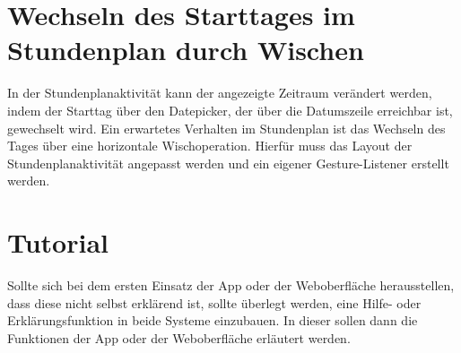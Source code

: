 \documentclass[noindent]{tudreport}
\begin{document}
		\section{Wechseln des Starttages im Stundenplan durch Wischen}
			In der Stundenplanaktivität kann der angezeigte Zeitraum verändert werden, indem der Starttag über den Datepicker, der über die Datumszeile erreichbar ist, gewechselt wird. Ein erwartetes Verhalten im Stundenplan ist das Wechseln des Tages über eine horizontale Wischoperation. Hierfür muss das Layout der Stundenplanaktivität angepasst werden und ein eigener Gesture-Listener erstellt werden.
		
		\section{Tutorial}
			Sollte sich bei dem ersten Einsatz der App oder der Weboberfläche herausstellen, dass diese nicht selbst erklärend ist, sollte überlegt werden, eine Hilfe- oder Erklärungsfunktion in beide Systeme einzubauen. In dieser sollen dann die Funktionen der App oder der Weboberfläche erläutert werden.
			
\end{document}
